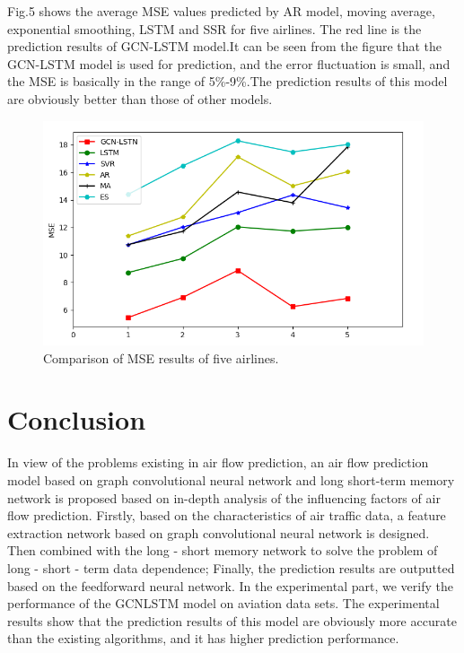 \documentclass[journal,article,submit,moreauthors,pdftex]{Definitions/mdpi}
\begin{document}
\par Fig.5 shows the average MSE values predicted by AR model, moving average, exponential smoothing, LSTM and SSR for five airlines. The red line is the prediction results of GCN-LSTM model.It can be seen from the figure that the GCN-LSTM model is used for prediction, and the error fluctuation is small, and the MSE is basically in the range of 5\%-9\%.The prediction results of this model are obviously better than those of other models.
\begin{figure}[htbp]
    \centering
    \includegraphics[width=12 cm]{./imgs/duibi.png}
    \caption{Comparison of MSE results of five airlines.}
    \label{fig:duibi}
\end{figure}



\section{Conclusion}\label{sec:4}
In view of the problems existing in air flow prediction, an air flow prediction model based on graph convolutional neural network and long short-term memory network is proposed based on in-depth analysis of the influencing factors of air flow prediction. Firstly, based on the characteristics of air traffic data, a feature extraction network based on graph convolutional neural network is designed. Then combined with the long - short memory network to solve the problem of long - short - term data dependence; Finally, the prediction results are outputted based on the feedforward neural network. In the experimental part, we verify the performance of the GCNLSTM model on aviation data sets. The experimental results show that the prediction results of this model are obviously more accurate than the existing algorithms, and it has higher prediction performance.
\vspace{6pt} 
\end{document}
